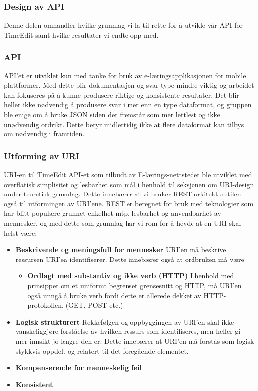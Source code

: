 \documentclass[../main.tex]{subfiles}
\begin{document}
\newpage

\subsubsection{Design av API}
Denne delen omhandler hvilke grunnlag vi la til rette for å utvikle vår API for TimeEdit samt hvilke resultater vi endte opp med.

\subsubsection{API}
API’et er utviklet kun med tanke for bruk av e-læringsapplikasjonen for mobile plattformer. Med dette blir dokumentasjon og svar-type mindre viktig og arbeidet kan fokuseres på å kunne produsere riktige og konsistente resultater. Det blir heller ikke nødvendig å produsere svar i mer enn en type dataformat, og gruppen ble enige om å bruke JSON siden det fremstår som mer lettlest og ikke unødvendig ordrikt. Dette betyr midlertidig ikke at flere dataformat kan tilbys om nødvendig i framtiden.

\subsubsection{Utforming av URI}
URI-en til TimeEdit API-et som tilbudt av E-lærings-nettstedet ble utviklet med overflatisk simplisitet og lesbarhet som mål i henhold til seksjonen om URI-design under teoretisk grunnlag. Dette innebærer at vi bruker REST-arkitekturstilen også til utformingen av URI'ene. REST er beregnet for bruk med teknologier som har blitt populære grunnet enkelhet mtp. lesbarhet og anvendbarhet av mennesker, og med dette som grunnlag har vi rom for å hevde at en URI skal helst være:
\begin{itemize}
\item \textbf{Beskrivende og meningsfull for mennesker} \newline
URI’en må beskrive ressursen URI’en identifiserer. Dette innebærer også at ordbruken må være
\begin{itemize}
\item \textbf{Ordlagt med substantiv og ikke verb (HTTP)} \newline
I henhold med prinsippet om et uniformt begrenset grensesnitt og HTTP, må URI’en også unngå å bruke verb fordi dette er allerede dekket av HTTP-protokollen. (GET, POST etc.)
\end{itemize}
\item \textbf{Logisk strukturert} \newline
Rekkefølgen og oppbyggingen av URI’en skal ikke vanskeliggjøre forståelse av hvilken ressurs som identifiseres, men heller gi mer innsikt jo lengre den er. Dette innebærer at URI’en må forstås som logisk stykkvis oppdelt og relatert til det foregående elementet.
\item \textbf{Kompenserende for menneskelig feil}
\item \textbf{Konsistent}
\end{itemize}
\end{document}
